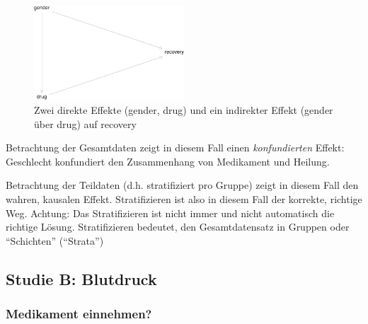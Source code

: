 \documentclass[
  a4paper,
  DIV=11]{scrreprt}
\theoremstyle{definition}
\theoremstyle{remark}
\begin{document}
\begin{figure}

{\centering \includegraphics[width=0.5\textwidth,height=\textheight]{./kausal_files/figure-pdf/fig-dag-studie-a-1.pdf}

}

\caption{\label{fig-dag-studie-a}Zwei direkte Effekte (gender, drug) und
ein indirekter Effekt (gender über drug) auf recovery}

\end{figure}

Betrachtung der Gesamtdaten zeigt in diesem Fall einen
\emph{konfundierten} Effekt: Geschlecht konfundiert den Zusammenhang von
Medikament und Heilung.

\begin{tcolorbox}[enhanced jigsaw, leftrule=.75mm, toptitle=1mm, bottomtitle=1mm, titlerule=0mm, breakable, colframe=quarto-callout-important-color-frame, title=\textcolor{quarto-callout-important-color}{\faExclamation}\hspace{0.5em}{Wichtig}, rightrule=.15mm, colback=white, arc=.35mm, left=2mm, bottomrule=.15mm, coltitle=black, opacitybacktitle=0.6, toprule=.15mm, colbacktitle=quarto-callout-important-color!10!white, opacityback=0]
Betrachtung der Teildaten (d.h. stratifiziert pro Gruppe) zeigt in
diesem Fall den wahren, kausalen Effekt. Stratifizieren ist also in
diesem Fall der korrekte, richtige Weg. Achtung: Das Stratifizieren ist
nicht immer und nicht automatisch die richtige Lösung. Stratifizieren
bedeutet, den Gesamtdatensatz in Gruppen oder ``Schichten'' (``Strata'')
\end{tcolorbox}

\hypertarget{studie-b-blutdruck}{%
\subsection{Studie B: Blutdruck}\label{studie-b-blutdruck}}

\hypertarget{medikament-einnehmen-1}{%
\subsubsection{Medikament einnehmen?}\label{medikament-einnehmen-1}}
\end{document}
